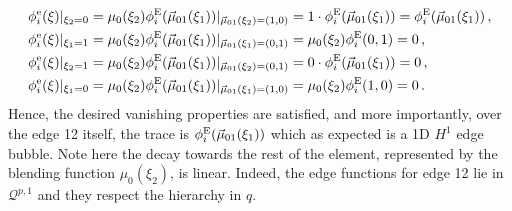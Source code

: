 \begin{align*}
    \phi_i^\mathrm{e}(\xi)|_{\xi_2=0}&=\mu_0(\xi_2)\phi_i^{\mathrm{E}}(\vec{\mu}_{01}(\xi_1))|_{\vec{\mu}_{01}(\xi_2)=(1,0)}
    	=1\cdot\phi_i^{\mathrm{E}}(\vec{\mu}_{01}(\xi_1))=\phi_i^{\mathrm{E}}(\vec{\mu}_{01}(\xi_1))\,,\\
    \phi_i^\mathrm{e}(\xi)|_{\xi_1=1}&=\mu_0(\xi_2)\phi_i^{\mathrm{E}}(\vec{\mu}_{01}(\xi_1))|_{\vec{\mu}_{01}(\xi_1)=(0,1)}
    	=\mu_0(\xi_2)\phi_i^{\mathrm{E}}(0,1)=0\,,\\
  	\phi_i^\mathrm{e}(\xi)|_{\xi_2=1}&=\mu_0(\xi_2)\phi_i^{\mathrm{E}}(\vec{\mu}_{01}(\xi_1))|_{\vec{\mu}_{01}(\xi_2)=(0,1)}
    	=0\cdot\phi_i^{\mathrm{E}}(\vec{\mu}_{01}(\xi_1))=0\,,\\
    \phi_i^\mathrm{e}(\xi)|_{\xi_1=0}&=\mu_0(\xi_2)\phi_i^{\mathrm{E}}(\vec{\mu}_{01}(\xi_1))|_{\vec{\mu}_{01}(\xi_1)=(1,0)}
    	=\mu_0(\xi_2)\phi_i^{\mathrm{E}}(1,0)=0\,.
\end{align*}
Hence, the desired vanishing properties are satisfied, and more importantly, over the edge 12 itself, the trace is $\phi_i^{\mathrm{E}}(\vec{\mu}_{01}(\xi_1))$ which as expected is a 1D $H^1$ edge bubble.
Note here the decay towards the rest of the element, represented by the blending function $\mu_0(\xi_2)$, is linear.
Indeed, the edge functions for edge 12 lie in $\mathcal{Q}^{p,1}$ and they respect the hierarchy in $q$.

